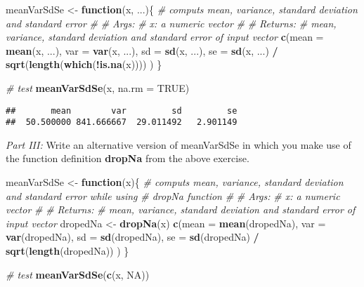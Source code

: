 \documentclass[12,]{article}
\newenvironment{Shaded}{\begin{snugshade}}{\end{snugshade}}
\newcommand{\KeywordTok}[1]{\textcolor[rgb]{0.13,0.29,0.53}{\textbf{#1}}}
\newcommand{\DataTypeTok}[1]{\textcolor[rgb]{0.13,0.29,0.53}{#1}}
\newcommand{\StringTok}[1]{\textcolor[rgb]{0.31,0.60,0.02}{#1}}
\newcommand{\CommentTok}[1]{\textcolor[rgb]{0.56,0.35,0.01}{\textit{#1}}}
\newcommand{\OtherTok}[1]{\textcolor[rgb]{0.56,0.35,0.01}{#1}}
\newcommand{\ControlFlowTok}[1]{\textcolor[rgb]{0.13,0.29,0.53}{\textbf{#1}}}
\newcommand{\OperatorTok}[1]{\textcolor[rgb]{0.81,0.36,0.00}{\textbf{#1}}}
\newcommand{\NormalTok}[1]{#1}
\begin{document}
\begin{Shaded}
\begin{Highlighting}[]
\NormalTok{meanVarSdSe <-}\StringTok{ }\ControlFlowTok{function}\NormalTok{(x, ...)\{}
  \CommentTok{# computs mean, variance, standard deviation and standard error}
  \CommentTok{#}
  \CommentTok{# Args:}
  \CommentTok{#   x: a numeric vector}
  \CommentTok{#}
  \CommentTok{# Returns:}
  \CommentTok{#   mean, variance, standard deviation and standard error of input vector}
  \KeywordTok{c}\NormalTok{(}\DataTypeTok{mean =} \KeywordTok{mean}\NormalTok{(x, ...),}
    \DataTypeTok{var =} \KeywordTok{var}\NormalTok{(x, ...),}
    \DataTypeTok{sd =} \KeywordTok{sd}\NormalTok{(x, ...),}
    \DataTypeTok{se =} \KeywordTok{sd}\NormalTok{(x, ...) }\OperatorTok{/}\StringTok{ }\KeywordTok{sqrt}\NormalTok{(}\KeywordTok{length}\NormalTok{(}\KeywordTok{which}\NormalTok{(}\OperatorTok{!}\KeywordTok{is.na}\NormalTok{(x))))}
\NormalTok{  )}
\NormalTok{\}}

\CommentTok{# test}
\KeywordTok{meanVarSdSe}\NormalTok{(x, }\DataTypeTok{na.rm =} \OtherTok{TRUE}\NormalTok{)}
\end{Highlighting}
\end{Shaded}

\begin{verbatim}
##       mean        var         sd         se 
##  50.500000 841.666667  29.011492   2.901149
\end{verbatim}

\vspace{1cm}

\emph{Part III:} Write an alternative version of meanVarSdSe in which
you make use of the function definition \textbf{dropNa} from the above
exercise.

\begin{Shaded}
\begin{Highlighting}[]
\NormalTok{meanVarSdSe <-}\StringTok{ }\ControlFlowTok{function}\NormalTok{(x)\{}
  \CommentTok{# computs mean, variance, standard deviation and standard error while using }
  \CommentTok{# dropNa function}
  \CommentTok{#}
  \CommentTok{# Args:}
  \CommentTok{#   x: a numeric vector}
  \CommentTok{#}
  \CommentTok{# Returns:}
  \CommentTok{#   mean, variance, standard deviation and standard error of input vector}
\NormalTok{  dropedNa <-}\StringTok{ }\KeywordTok{dropNa}\NormalTok{(x)}
  \KeywordTok{c}\NormalTok{(}\DataTypeTok{mean =} \KeywordTok{mean}\NormalTok{(dropedNa),}
    \DataTypeTok{var =} \KeywordTok{var}\NormalTok{(dropedNa),}
    \DataTypeTok{sd =} \KeywordTok{sd}\NormalTok{(dropedNa),}
    \DataTypeTok{se =} \KeywordTok{sd}\NormalTok{(dropedNa) }\OperatorTok{/}\StringTok{ }\KeywordTok{sqrt}\NormalTok{(}\KeywordTok{length}\NormalTok{(dropedNa))}
\NormalTok{  )}
\NormalTok{\}}

\CommentTok{# test}
\KeywordTok{meanVarSdSe}\NormalTok{(}\KeywordTok{c}\NormalTok{(x, }\OtherTok{NA}\NormalTok{))}
\end{Highlighting}
\end{Shaded}
\end{document}
